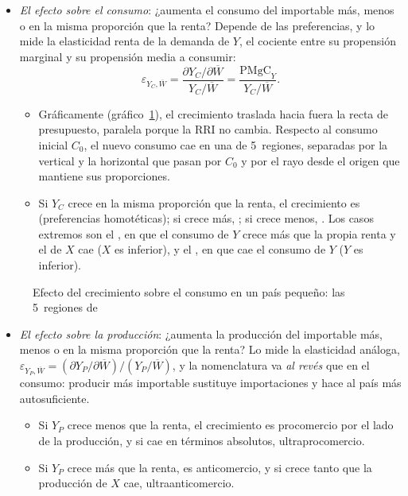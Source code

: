 \documentclass[11pt]{article}
\begin{document}
\begin{itemize}
\item \emph{El efecto sobre el consumo}: ¿aumenta el consumo del importable más, menos o en la misma proporción que la renta? Depende de las preferencias, y lo mide la elasticidad renta de la demanda de $Y$, el cociente entre su propensión marginal y su propensión media a consumir:
  \begin{equation}\label{eq:elasticidad-consumo}
  \varepsilon_{Y_C,\overline W}=\frac{\partial Y_C/\partial\overline W}{Y_C/\overline W}=\frac{\mathrm{PMgC}_Y}{Y_C/\overline W}.
  \end{equation}
  \begin{itemize}
  \item Gráficamente (gráfico~\ref{fig:consumo}), el crecimiento traslada hacia fuera la recta de presupuesto, paralela porque la RRI no cambia. Respecto al consumo inicial $C_0$, el nuevo consumo cae en una de 5~regiones, separadas por la vertical y la horizontal que pasan por $C_0$ y por el rayo desde el origen que mantiene sus proporciones.
  \item Si $Y_C$ crece en la misma proporción que la renta, el crecimiento es  (preferencias homotéticas); si crece más, ; si crece menos, . Los casos extremos son el , en que el consumo de $Y$ crece más que la propia renta y el de $X$ cae ($X$ es inferior), y el , en que cae el consumo de $Y$ ($Y$ es inferior).
  \end{itemize}
\end{itemize}
\begin{figure}[H]
\centering
\caption{Efecto del crecimiento sobre el consumo en un país pequeño: las 5~regiones de }\label{fig:consumo}
\end{figure}
\begin{itemize}
\item \emph{El efecto sobre la producción}: ¿aumenta la producción del importable más, menos o en la misma proporción que la renta? Lo mide la elasticidad análoga, $\varepsilon_{Y_P,\overline W}=(\partial Y_P/\partial\overline W)/(Y_P/\overline W)$, y la nomenclatura va \emph{al revés} que en el consumo: producir más importable sustituye importaciones y hace al país más autosuficiente.
  \begin{itemize}
  \item Si $Y_P$ crece menos que la renta, el crecimiento es procomercio por el lado de la producción, y si cae en términos absolutos, ultraprocomercio.
  \item Si $Y_P$ crece más que la renta, es anticomercio, y si crece tanto que la producción de $X$ cae, ultraanticomercio.
  \end{itemize}
\end{itemize}
\end{document}

